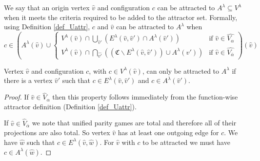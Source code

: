 We say that an origin vertex $\hat{v}$ and configuration $c$ can be attracted to $A^\lambda \subseteq V^\lambda$ when it meets the criteria required to be added to the attractor set. Formally, using Definition \ref{def_Uattr}, $c$ and $\hat{v}$ can be attracted to $A^\lambda$ when 
\[
c \in \left( A^\lambda(\hat{v}) \cup \begin{cases}
V^\lambda(\hat{v}) \cap \bigcup_{\hat{v}'} (E^\lambda(\hat{v},\hat{v}') \cap A^\lambda(\hat{v}')) & \text{if } \hat{v} \in \hat{V_{\alpha}}\\
V^\lambda(\hat{v}) \cap \bigcap_{\hat{v'}}((\mathfrak{C} \backslash E^\lambda(\hat{v},\hat{v}')) \cup A^\lambda(\hat{v}')) & \text{if }\hat{v} \in  \hat{V_{\overline{\alpha}}}\end{cases} \right)(\hat{v})
\]
\begin{lemma}
\label{lem_attr_requires_E}
Vertex $\hat{v}$ and configuration $c$, with $c \in V^\lambda(\hat{v})$, can only be attracted to $A^\lambda$ if there is a vertex $\hat{v}'$ such that $c \in E^\lambda(\hat{v}, \hat{v}')$ and $c \in A^\lambda(\hat{v}')$.
	\begin{proof}
		If $\hat{v} \in \hat{V}_\alpha$ then this property follows immediately from the function-wise attractor definition (Definition \ref{def_Uattr}). 
		
		If $\hat{v} \in \hat{V}_{\overline{\alpha}}$ we note that unified parity games are total and therefore all of their projections are also total. So vertex $\hat{v}$ has at least one outgoing edge for $c$. We have $\hat{w}$ such that $c \in E^\lambda(\hat{v},\hat{w})$. For $\hat{v}$ with $c$ to be attracted we must have $c \in A^\lambda(\hat{w})$.
	\end{proof}
\end{lemma}
